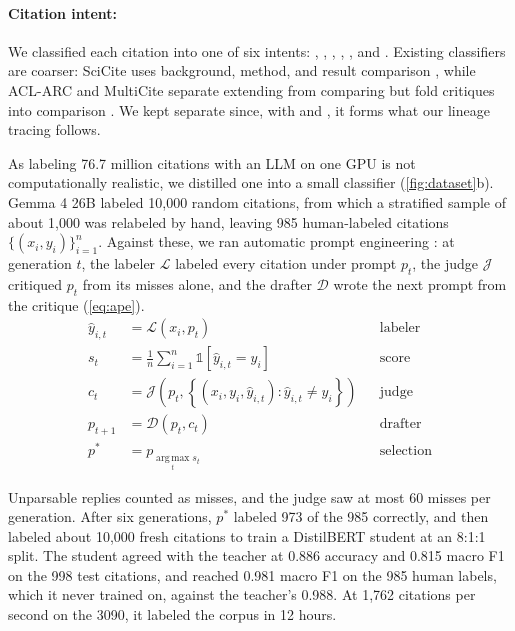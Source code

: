\paragraph{Citation intent:}
We classified each citation into one of six intents: , , , , , and . Existing classifiers are coarser: SciCite uses background, method, and result comparison \citep{cohan2019scaffolds}, while ACL-ARC and MultiCite separate extending from comparing but fold critiques into comparison \citep{jurgens2018citation,lauscher2022multicite}. We kept  separate since, with  and , it forms what our lineage tracing follows.

As labeling 76.7 million citations with an LLM on one GPU is not computationally realistic, we distilled one into a small classifier (\cref{fig:dataset}b). Gemma 4 26B \citep{gemmateam2026gemma4} labeled 10,000 random citations, from which a stratified sample of about 1,000 was relabeled by hand, leaving 985 human-labeled citations $\{(x_i, y_i)\}_{i=1}^{n}$. Against these, we ran automatic prompt engineering \citep{zhou2023ape}: at generation $t$, the labeler $\mathcal{L}$ labeled every citation under prompt $p_t$, the judge $\mathcal{J}$ critiqued $p_t$ from its misses alone, and the drafter $\mathcal{D}$ wrote the next prompt from the critique (\cref{eq:ape}).
\begin{equation}
    \label{eq:ape}
    \begin{aligned}
        \hat{y}_{i,t} &= \mathcal{L}(x_i, p_t) && \text{labeler} \\
        s_t &= \frac{1}{n} \sum_{i=1}^{n} \mathbb{1}\left[\hat{y}_{i,t} = y_i\right] && \text{score} \\
        c_t &= \mathcal{J}\left(p_t, \left\{(x_i, y_i, \hat{y}_{i,t}) : \hat{y}_{i,t} \neq y_i\right\}\right) && \text{judge} \\
        p_{t+1} &= \mathcal{D}(p_t, c_t) && \text{drafter} \\
        p^{\ast} &= p_{\operatorname*{arg\,max}_{t} s_t} && \text{selection}
    \end{aligned}
\end{equation}

Unparsable replies counted as misses, and the judge saw at most 60 misses per generation. After six generations, $p^{\ast}$ labeled 973 of the 985 correctly, and then labeled about 10,000 fresh citations to train a DistilBERT student \citep{sanh2019distilbert} at an 8:1:1 split. The student agreed with the teacher at 0.886 accuracy and 0.815 macro F1 on the 998 test citations, and reached 0.981 macro F1 on the 985 human labels, which it never trained on, against the teacher's 0.988. At 1,762 citations per second on the 3090, it labeled the corpus in 12 hours.

